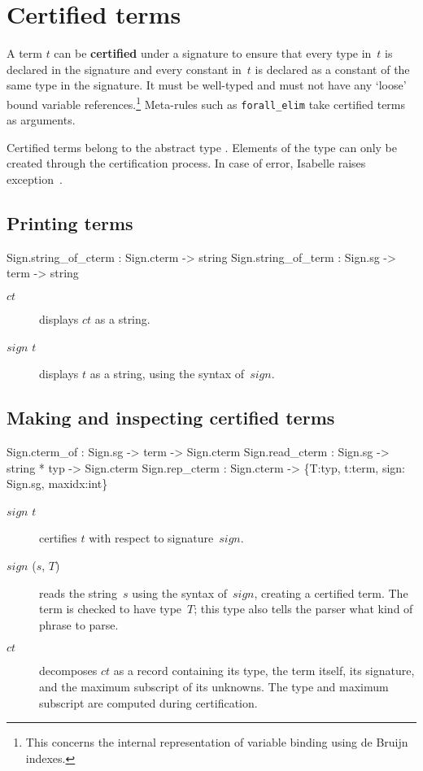 \section{Certified terms}
A term $t$ can be {\bf certified} under a signature to ensure that every
type in~$t$ is declared in the signature and every constant in~$t$ is
declared as a constant of the same type in the signature.  It must be
well-typed and must not have any `loose' bound variable
references.\footnote{This concerns the internal representation of variable
binding using de Bruijn indexes.} Meta-rules such as {\tt forall_elim} take
certified terms as arguments.

Certified terms belong to the abstract type .
Elements of the type can only be created through the certification process.
In case of error, Isabelle raises exception~\@.

\subsection{Printing terms}
\begin{ttbox} 
Sign.string_of_cterm :      Sign.cterm -> string
Sign.string_of_term  : Sign.sg -> term -> string
\end{ttbox}
\begin{description}
\item[ $ct$] 
displays $ct$ as a string.

\item[ $sign$ $t$] 
displays $t$ as a string, using the syntax of~$sign$.
\end{description}

\subsection{Making and inspecting certified terms}
\begin{ttbox} 
Sign.cterm_of   : Sign.sg -> term -> Sign.cterm
Sign.read_cterm : Sign.sg -> string * typ -> Sign.cterm
Sign.rep_cterm  : Sign.cterm -> \{T:typ, t:term, 
                                 sign: Sign.sg, maxidx:int\}
\end{ttbox}
\begin{description}
\item[ $sign$ $t$] 
certifies $t$ with respect to signature~$sign$.

\item[ $sign$ ($s$, $T$)] 
reads the string~$s$ using the syntax of~$sign$, creating a certified term.
The term is checked to have type~$T$; this type also tells the parser what
kind of phrase to parse.

\item[ $ct$] 
decomposes $ct$ as a record containing its type, the term itself, its
signature, and the maximum subscript of its unknowns.  The type and maximum
subscript are computed during certification.
\end{description}



